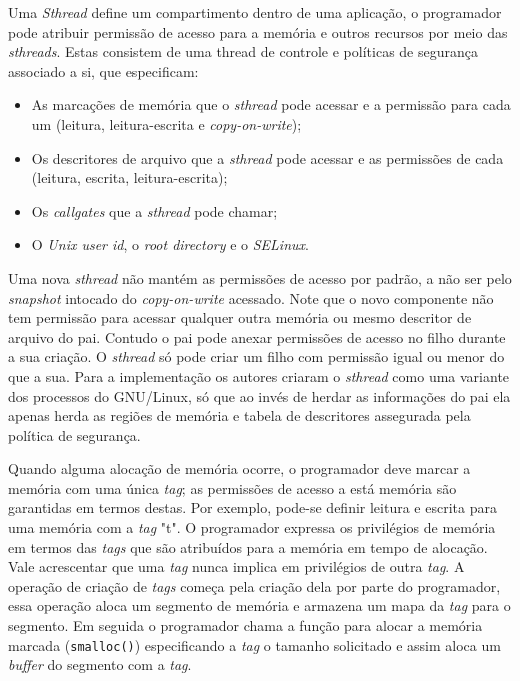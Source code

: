 Uma \emph{Sthread} define um compartimento dentro de uma aplicação, o
programador pode atribuir permissão de acesso para a memória e outros recursos
por meio das \emph{sthreads}. Estas consistem de uma thread de controle e
políticas de segurança associado a si, que especificam:

\begin{itemize}
	\item As marcações de memória que o \emph{sthread} pode acessar e a permissão
				para cada um (leitura, leitura-escrita e \textit{copy-on-write});
	\item Os descritores de arquivo que a \emph{sthread} pode acessar e as
				permissões de cada (leitura, escrita, leitura-escrita);
	\item Os \emph{callgates} que a \emph{sthread} pode chamar;
	\item O \emph{Unix user id}, o \emph{root directory} e o \emph{SELinux}.
\end{itemize}

Uma nova \emph{sthread} não mantém as permissões de acesso por padrão, a não
ser pelo \emph{snapshot} intocado do \emph{copy-on-write} acessado. Note que o
novo componente não tem permissão para acessar qualquer outra memória ou mesmo
descritor de arquivo do pai. Contudo o pai pode anexar permissões de acesso no
filho durante a sua criação. O \emph{sthread} só pode criar um filho com
permissão igual ou menor do que a sua. Para a implementação os autores criaram
o \emph{sthread} como uma variante dos processos do GNU/Linux, só que ao invés
de herdar as informações do pai ela apenas herda as regiões de memória e tabela
de descritores assegurada pela política de segurança.

Quando alguma alocação de memória ocorre, o programador deve marcar a memória
com uma única \emph{tag}; as permissões de acesso a está memória são garantidas
em termos destas. Por exemplo, pode-se definir leitura e escrita para uma
memória com a \emph{tag} "t". O programador expressa os privilégios de memória
em termos das \emph{tags} que são atribuídos para a memória em tempo de
alocação. Vale acrescentar que uma \emph{tag} nunca implica em privilégios de
outra \emph{tag}. A operação de criação de \emph{tags} começa pela criação dela
por parte do programador, essa operação aloca um segmento de memória e armazena
um mapa da \emph{tag} para o segmento. Em seguida o programador chama a função
para alocar a memória marcada (\texttt{smalloc()}) especificando a \emph{tag} o
tamanho solicitado e assim aloca um \emph{buffer} do segmento com a \emph{tag}.

